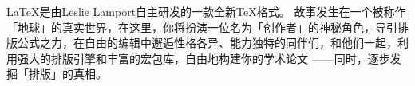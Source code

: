 \fontsize{12pt}{0pt}
\par \LaTeX 是由Leslie Lamport自主研发的一款全新\TeX 格式。
故事发生在一个被称作「地球」的真实世界，在这里，你将扮演一位名为「创作者」的神秘角色，导引排版公式之力，在自由的编辑中邂逅性格各异、能力独特的同伴们，和他们一起，利用强大的排版引擎和丰富的宏包库，自由地构建你的学术论文
——同时，逐步发掘「排版」的真相。
